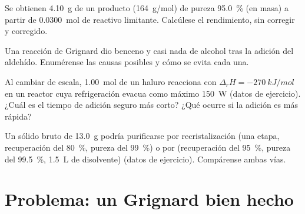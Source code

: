 \begin{exercise}[$\star\star$]\label{exo:b2:lab-techniques-2:9}
Se obtienen \qty{4.10}{g} de un producto (\qty{164}{g/mol}) de pureza 95.0~\% (en masa) a partir de \qty{0.0300}{mol}
de reactivo limitante. Calcúlese el rendimiento, sin corregir y corregido.
\end{exercise}

\begin{exercise}[$\star\star\star$]\label{exo:b2:lab-techniques-2:10}
Una reacción de Grignard dio benceno y casi nada de alcohol tras la adición del aldehído. Enumérense las
causas posibles y cómo se evita cada una.
\end{exercise}

\begin{exercise}[$\star\star\star$]\label{exo:b2:lab-techniques-2:11}
Al cambiar de escala, \qty{1.00}{mol} de un haluro reacciona con $\Delta_rH = \qty{-270}{kJ/mol}$ en un reactor cuya
refrigeración evacua como máximo \qty{150}{W} (datos de ejercicio). ¿Cuál es el tiempo de adición seguro más corto? ¿Qué
ocurre si la adición es más rápida?
\end{exercise}

\begin{exercise}[$\star\star\star$]\label{exo:b2:lab-techniques-2:12}
Un sólido bruto de \qty{13.0}{g} podría purificarse por recristalización (una etapa, recuperación del 80~\%, pureza
del 99~\%) o por  (recuperación del 95~\%, pureza del 99.5~\%, \qty{1.5}{L} de disolvente) (datos de
ejercicio). Compárense ambas vías.
\end{exercise}

\section{Problema: un Grignard bien hecho}

